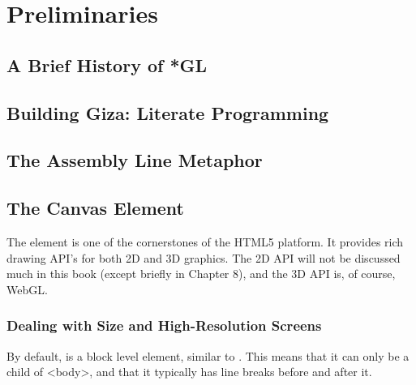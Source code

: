 \chapter{Preliminaries}

\section{A Brief History of *GL}

\section{Building Giza: Literate Programming}

\section{The Assembly Line Metaphor}

\section{The Canvas Element}


The  element is one of the cornerstones of the HTML5 platform.  It provides rich drawing API's for both 2D and 3D graphics.  The 2D API will not be discussed much in this book (except briefly in Chapter 8), and the 3D API is, of course, WebGL.

\subsection{Dealing with Size and High-Resolution Screens}

By default,  is a block level element, similar to .  This means that it can only be a child of <body>, and that it typically has line breaks before and after it.

